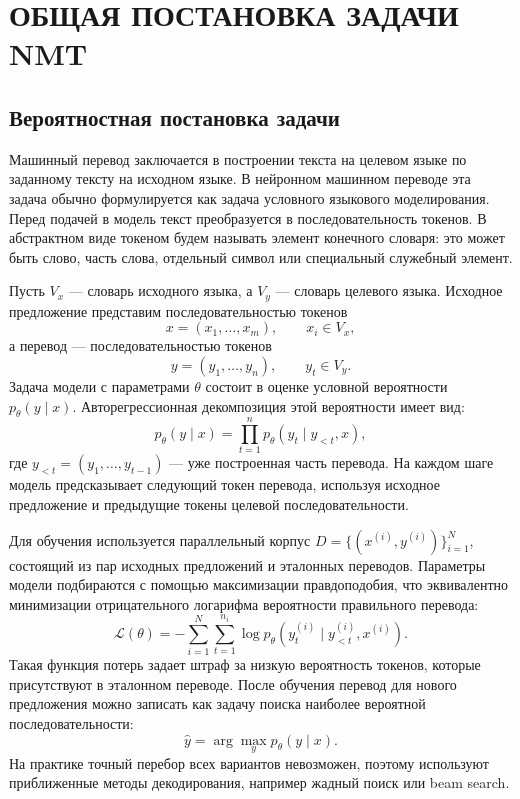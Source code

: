 \section{ОБЩАЯ ПОСТАНОВКА ЗАДАЧИ NMT}

\subsection{Вероятностная постановка задачи}

Машинный перевод заключается в построении текста на целевом языке по заданному тексту на исходном языке.
В нейронном машинном переводе эта задача обычно формулируется как задача условного языкового моделирования.
Перед подачей в модель текст преобразуется в последовательность токенов.
В абстрактном виде токеном будем называть элемент конечного словаря: это может быть слово, часть слова, отдельный символ или специальный служебный элемент.

Пусть $V_x$ --- словарь исходного языка, а $V_y$ --- словарь целевого языка.
Исходное предложение представим последовательностью токенов
\[
	x = (x_1, \ldots, x_m), \qquad x_i \in V_x,
\]
а перевод --- последовательностью токенов
\[
	y = (y_1, \ldots, y_n), \qquad y_t \in V_y.
\]
Задача модели с параметрами $\theta$ состоит в оценке условной вероятности $p_\theta(y \mid x)$.
Авторегрессионная декомпозиция этой вероятности имеет вид:
\[
	p_\theta(y \mid x) = \prod_{t=1}^{n} p_\theta(y_t \mid y_{<t}, x),
\]
где $y_{<t} = (y_1, \ldots, y_{t-1})$ --- уже построенная часть перевода.
На каждом шаге модель предсказывает следующий токен перевода, используя исходное предложение и предыдущие токены целевой последовательности.

Для обучения используется параллельный корпус
$D = \{(x^{(i)}, y^{(i)})\}_{i=1}^{N}$, состоящий из пар исходных предложений и эталонных переводов.
Параметры модели подбираются с помощью максимизации правдоподобия, что эквивалентно минимизации отрицательного логарифма вероятности правильного перевода:
\[
	\mathcal{L}(\theta) = - \sum_{i=1}^{N} \sum_{t=1}^{n_i}
	\log p_\theta\left(y_t^{(i)} \mid y_{<t}^{(i)}, x^{(i)}\right).
\]
Такая функция потерь задает штраф за низкую вероятность токенов, которые присутствуют в эталонном переводе.
После обучения перевод для нового предложения можно записать как задачу поиска наиболее вероятной последовательности:
\[
	\hat{y} = \arg\max_y p_\theta(y \mid x).
\]
На практике точный перебор всех вариантов невозможен, поэтому используют приближенные методы декодирования, например жадный поиск или beam search.

